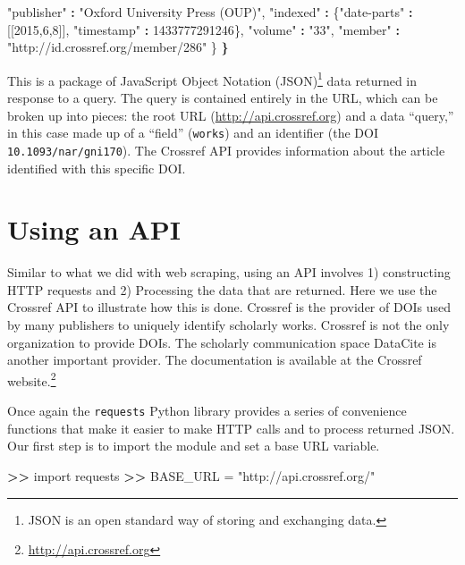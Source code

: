 \documentclass[]{krantz}
\newenvironment{Shaded}{\begin{snugshade}}{\end{snugshade}}
\newcommand{\DecValTok}[1]{\textcolor[rgb]{0.00,0.00,0.81}{#1}}
\newcommand{\StringTok}[1]{\textcolor[rgb]{0.31,0.60,0.02}{#1}}
\newcommand{\OperatorTok}[1]{\textcolor[rgb]{0.81,0.36,0.00}{\textbf{#1}}}
\newcommand{\ErrorTok}[1]{\textcolor[rgb]{0.64,0.00,0.00}{\textbf{#1}}}
\newcommand{\NormalTok}[1]{#1}
\begin{document}
\begin{Shaded}
\begin{Highlighting}[]
     \StringTok{"publisher"} \OperatorTok{:}\StringTok{ "Oxford University Press (OUP)"}\NormalTok{,}
     \StringTok{"indexed"} \OperatorTok{:}\StringTok{ }\NormalTok{\{}\StringTok{"date-parts"} \OperatorTok{:}\StringTok{ }\NormalTok{[[}\DecValTok{2015}\NormalTok{,}\DecValTok{6}\NormalTok{,}\DecValTok{8}\NormalTok{]],}
                  \StringTok{"timestamp"} \OperatorTok{:}\StringTok{ }\DecValTok{1433777291246}\NormalTok{\},}
     \StringTok{"volume"} \OperatorTok{:}\StringTok{ "33"}\NormalTok{,}
     \StringTok{"member"} \OperatorTok{:}\StringTok{ "http://id.crossref.org/member/286"}
\NormalTok{   \}}
\ErrorTok{\}}
\end{Highlighting}
\end{Shaded}

This is a package of JavaScript Object Notation (JSON)\footnote{JSON is
  an open standard way of storing and exchanging data.} data returned in
response to a query. The query is contained entirely in the URL, which
can be broken up into pieces: the root URL
(\url{http://api.crossref.org}) and a data ``query,'' in this case made
up of a ``field'' (\texttt{works}) and an identifier (the DOI
\texttt{10.1093/nar/gni170}). The Crossref API provides information
about the article identified with this specific DOI.

\section{Using an API}\label{using-an-api}

Similar to what we did with web scraping, using an API involves 1)
constructing HTTP requests and 2) Processing the data that are returned.
Here we use the Crossref API to illustrate how this is done. Crossref is
the provider of DOIs used by many publishers to uniquely identify
scholarly works. Crossref is not the only organization to provide DOIs.
The scholarly communication space DataCite is another important
provider. The documentation is available at the Crossref
website.\footnote{\url{http://api.crossref.org}}

Once again the \texttt{requests} Python library provides a series of
convenience functions that make it easier to make HTTP calls and to
process returned JSON. Our first step is to import the module and set a
base URL variable.

\begin{Shaded}
\begin{Highlighting}[]
\OperatorTok{>}\ErrorTok{>}\StringTok{ }\NormalTok{import requests}
\OperatorTok{>}\ErrorTok{>}\StringTok{ }\NormalTok{BASE_URL =}\StringTok{ "http://api.crossref.org/"}
\end{Highlighting}
\end{Shaded}
\end{document}
